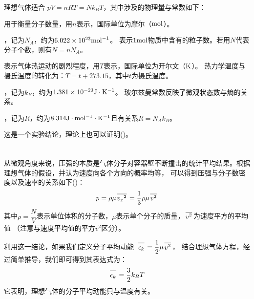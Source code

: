 理想气体适合 \quad$pV=nRT=Nk_{B}T$，其中涉及的物理量与常数如下：
\begin{Itemize}
    \item {} 用于衡量分子数量，用$n$表示，国际单位为摩尔（$\rm{mol}$）。
    \item {}，记为$N_{A}$，约为$6.022\times 10^{23}\rm{mol}^{-1}$。
    表示$1\rm{mol}$物质中含有的粒子数。若用$N$代表分子个数，则有$N=nN_{A}$。
    \item {} 表示气体热运动的剧烈程度，用$T$表示，国际单位为开尔文（$\rm{K}$）。
    热力学温度与摄氏温度的转化为：$T = t + 273.15$，其中$t$为摄氏温度。
    \item {}，记为$k_{B}$，约为$1.381\times 10^{-23}\rm{J}\cdot K^{-1}$。
    玻尔兹曼常数反映了微观状态数与熵的关系。
    \item {}，记为$R$，约为$8.314\rm{J}\cdot mol^{-1}\cdot K^{-1}$且有关系$R=N_{A}k_{B}$。
\end{Itemize}

这是一个实验结论，理论上也可以证明()。
\section[分子动理论]{}
\subsection[压强的微观解释]{}
从微观角度来说，压强的本质是气体分子对容器壁不断撞击的统计平均结果。根据理想气体的假设，并认为速度向各个方向的概率均等，
可以得到压强与分子数密度以及速率的关系如下()：
\begin{equation}
    p = \rho \mu \upperline{v_{x}{}^{2}}=\frac{1}{3}\rho \mu \upperline{v^{2}}
    \nonumber
\end{equation}
其中$\rho = \dfrac{N}{V}$表示单位体积的分子数，$\mu$表示单个分子的质量，$\upperline{v^{2}}$为速度平方的平均值
（注意与速度平均值的平方$\overline{v}{}^2$区分）。

利用这一结论，如果我们定义分子平均动能\ $\upperline{\epsilon_{k}} = \dfrac{1}{2} \mu \upperline{v^{2}}$，
结合理想气体方程，经过简单推导，我们即可得到其表达式为：
\begin{equation}
    \upperline{\epsilon_{k}} = \frac{3}{2}k_{B}T
    \nonumber
\end{equation}
它表明，理想气体的分子平均动能只与温度有关。
